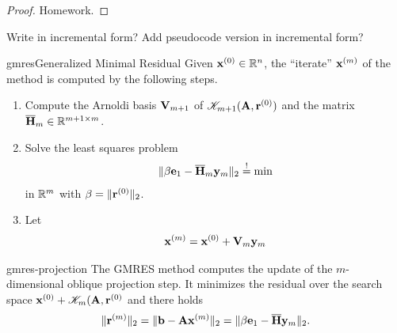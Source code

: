 \begin{proof}
  Homework.
\end{proof}

\begin{todo}
  Write in incremental form? Add pseudocode version in incremental form?
\end{todo}

\begin{Algorithm*}{gmres}{Generalized Minimal Residual}
  Given $\mathbf x^{(0)}\in\mathbb R^n$, the ``iterate'' $\mathbf x^{(m)}$ of the
   method is computed by the following steps.
  \begin{enumerate}
  \item Compute the Arnoldi basis $\mathbf V_{m+1}$ of
    $\mathscr K_{m+1}(\mathbf A,\mathbf r^{(0)})$ and the matrix $\overline{\mathbf H}_m\in\mathbb R^{m+1\times m}$.
  \item Solve the least squares problem
    \begin{gather}
      \lVert\beta\mathbf e_1 - \overline{\mathbf H}_m \mathbf y_m\rVert_2 \stackrel{!}{=} \min
    \end{gather}
    in $\mathbb R^m$ with $\beta = \lVert\mathbf r^{(0)}\rVert_2$.
  \item Let
    \begin{gather}
      \mathbf x^{(m)} = \mathbf x^{(0)} + \mathbf V_{m}\mathbf y_m
    \end{gather}
  \end{enumerate}
\end{Algorithm*}

\begin{Theorem}{gmres-projection}
  The GMRES method computes the update of the $m$-dimensional oblique
  projection step. It minimizes the residual over the search space
  $\mathbf x^{(0)} +\mathscr K_m(\mathbf A,\mathbf r^{(0)}$ and there holds
  \begin{gather}
    \label{eq:gmres-norm}
    \lVert\mathbf r^{(m)}\rVert_2 = \lVert\mathbf b-\mathbf A\mathbf x^{(m)}\rVert_2 =
    \lVert\beta\mathbf e_1 - \overline{\mathbf H} \mathbf y_m\rVert_2.
  \end{gather}
\end{Theorem}

